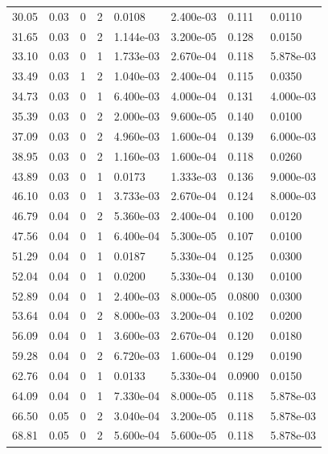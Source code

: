 \documentclass[preview]{standalone}
\begin{document}
{{\begin{tabular}{L{1.2cm}C{1.2cm} C{0.3cm}C{0.5cm} C{1.4cm}C{1.4cm} C{1.4cm}C{1.4cm}}
  30.05  &  0.03  & 0     &  2 &  0.0108  & 2.400e-03  & 0.111 &  0.0110   \\ 
  31.65  &  0.03  & 0     &  2 &  1.144e-03  & 3.200e-05  & 0.128 &  0.0150   \\ 
  33.10  &  0.03  & 0     &  1 &  1.733e-03  & 2.670e-04  & 0.118 &  5.878e-03   \\ 
  33.49  &  0.03  & 1     &  2 &  1.040e-03  & 2.400e-04  & 0.115 &  0.0350   \\ 
  34.73  &  0.03  & 0     &  1 &  6.400e-03  & 4.000e-04  & 0.131 &  4.000e-03   \\ 
  35.39  &  0.03  & 0     &  2 &  2.000e-03  & 9.600e-05  & 0.140 &  0.0100   \\ 
  37.09  &  0.03  & 0     &  2 &  4.960e-03  & 1.600e-04  & 0.139 &  6.000e-03   \\ 
  38.95  &  0.03  & 0     &  2 &  1.160e-03  & 1.600e-04  & 0.118 &  0.0260   \\ 
  43.89  &  0.03  & 0     &  1 &  0.0173  & 1.333e-03  & 0.136 &  9.000e-03   \\ 
  46.10  &  0.03  & 0     &  1 &  3.733e-03  & 2.670e-04  & 0.124 &  8.000e-03   \\ 
  46.79  &  0.04  & 0     &  2 &  5.360e-03  & 2.400e-04  & 0.100 &  0.0120   \\ 
  47.56  &  0.04  & 0     &  1 &  6.400e-04  & 5.300e-05  & 0.107 &  0.0100   \\ 
  51.29  &  0.04  & 0     &  1 &  0.0187  & 5.330e-04  & 0.125 &  0.0300   \\ 
  52.04  &  0.04  & 0     &  1 &  0.0200  & 5.330e-04  & 0.130 &  0.0100   \\ 
  52.89  &  0.04  & 0     &  1 &  2.400e-03  & 8.000e-05  & 0.0800 &  0.0300   \\ 
  53.64  &  0.04  & 0     &  2 &  8.000e-03  & 3.200e-04  & 0.102 &  0.0200   \\ 
  56.09  &  0.04  & 0     &  1 &  3.600e-03  & 2.670e-04  & 0.120 &  0.0180   \\ 
  59.28  &  0.04  & 0     &  2 &  6.720e-03  & 1.600e-04  & 0.129 &  0.0190   \\ 
  62.76  &  0.04  & 0     &  1 &  0.0133  & 5.330e-04  & 0.0900 &  0.0150   \\ 
  64.09  &  0.04  & 0     &  1 &  7.330e-04  & 8.000e-05  & 0.118 &  5.878e-03   \\ 
  66.50  &  0.05  & 0     &  2 &  3.040e-04  & 3.200e-05  & 0.118 &  5.878e-03   \\ 
  68.81  &  0.05  & 0     &  2 &  5.600e-04  & 5.600e-05  & 0.118 &  5.878e-03   \\ 

\end{tabular}}}
\end{document}
